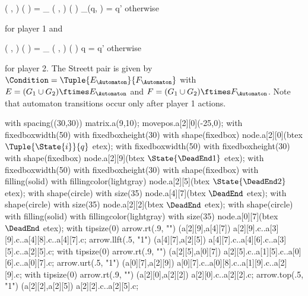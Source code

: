     \startformula
        \Transition
            \Big( ,  \Big)
            \Big(  \Big)
        = \startmathcases
            \NC \Transition_\GameGraph
            \Big( ,  \Big)
            \Big(  \Big)
            \MC \StartIf \Transition_\Automaton(q, ) = q'
            \NR
            \NC otherwise
            \NR
        \stopmathcases
    \stopformula

    for player 1 and

    \startformula
        \Transition
            \Big( ,  \Big)
            \Big(  \Big)
        = \startmathcases
            \NC \Transition_\GameGraph
            \Big( ,  \Big)
            \Big(  \Big)
            \MC \StartIf q = q'
            \NR
            \NC otherwise
            \NR
        \stopmathcases
    \stopformula

    for player 2.
    The Streett pair is given by $\Condition = \Tuple{E_\Automaton}{F_\Automaton}$ with $E = (G_1 \cup G_2) \ftimes E_\Automaton$ and $F = (G_1 \cup G_2) \ftimes F_\Automaton$.
    Note that automaton transitions occur only after player 1 actions.

\stopsubsection


    with spacing((30,30)) matrix.a(9,10);
    movepos.a[2][0](-25,0);
    with fixedboxwidth(50) with fixedboxheight(30) with shape(fixedbox) node.a[2][0](btex $\Tuple{\State{i}}{q}$ etex);
    with fixedboxwidth(50) with fixedboxheight(30) with shape(fixedbox) node.a[2][9](btex $\State{\DeadEnd1}$ etex);
    with fixedboxwidth(50) with fixedboxheight(30) with shape(fixedbox) with filling(solid) with fillingcolor(lightgray) node.a[2][5](btex $\State{\DeadEnd2}$ etex);
    with shape(circle) with size(35) node.a[4][7](btex \ssd $\DeadEnd$ etex);
    with shape(circle) with size(35) node.a[2][2](btex \ssd $\DeadEnd$ etex);
    with shape(circle) with filling(solid) with fillingcolor(lightgray) with size(35) node.a[0][7](btex \ssd $\DeadEnd$ etex);
    with tipsize(0) arrow.rt(.9, "") (a[2][9],a[4][7]) a[2][9].c..a[3][9].c..a[4][8].c..a[4][7].c;
    arrow.llft(.5, "1") (a[4][7],a[2][5]) a[4][7].c..a[4][6].c..a[3][5].c..a[2][5].c;
    with tipsize(0) arrow.rt(.9, "") (a[2][5],a[0][7]) a[2][5].c..a[1][5].c..a[0][6].c..a[0][7].c;
    arrow.urt(.5, "1") (a[0][7],a[2][9]) a[0][7].c..a[0][8].c..a[1][9].c..a[2][9].c;
    with tipsize(0) arrow.rt(.9, "") (a[2][0],a[2][2]) a[2][0].c..a[2][2].c;
    arrow.top(.5, "1") (a[2][2],a[2][5]) a[2][2].c..a[2][5].c;
\stopreusableMPgraphic


